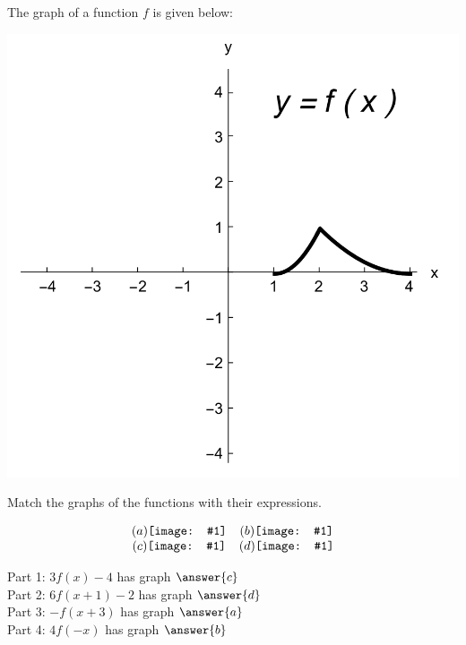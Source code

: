\documentclass{ximera}
\author{Nala Lakos \and Kyle Parsons}
\newcommand{\vcenteredinclude}[1]{\begingroup
\setbox0=\hbox{\texttt{[image: \#1]}}%
\parbox{\wd0}{\box0}\endgroup}
\begin{document}
\begin{exercise}

The graph of a function $f$ is given below:

\begin{image}
\includegraphics{matchingTransGraph1.png}
\end{image}

Match the graphs of the functions with their expressions.

\begin{displaymath}
\begin{array}{cc}
(a)\vcenteredinclude{transGraphA.png} & (b)\vcenteredinclude{transGraphB.png}\\
(c)\vcenteredinclude{transGraphC.png} & (d)\vcenteredinclude{transGraphD.png}
\end{array}
\end{displaymath}


Part 1: $3f(x)-4$ has graph $\answer{c}$\\
Part 2: $6f(x+1)-2$ has graph $\answer{d}$\\
Part 3: $-f(x+3)$ has graph $\answer{a}$\\
Part 4: $4f(-x)$ has graph $\answer{b}$


\end{exercise}
\end{document}
